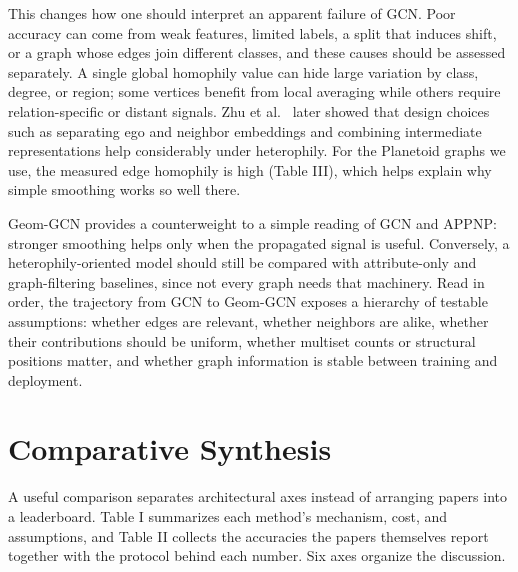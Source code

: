 \documentclass[conference]{IEEEtran}
\begin{document}
This changes how one should interpret an apparent failure of GCN. Poor accuracy can come from weak features, limited labels, a split that induces shift, or a graph whose edges join different classes, and these causes should be assessed separately. A single global homophily value can hide large variation by class, degree, or region; some vertices benefit from local averaging while others require relation-specific or distant signals. Zhu et al.~\cite{b14} later showed that design choices such as separating ego and neighbor embeddings and combining intermediate representations help considerably under heterophily. For the Planetoid graphs we use, the measured edge homophily is high (Table III), which helps explain why simple smoothing works so well there.

Geom-GCN provides a counterweight to a simple reading of GCN and APPNP: stronger smoothing helps only when the propagated signal is useful. Conversely, a heterophily-oriented model should still be compared with attribute-only and graph-filtering baselines, since not every graph needs that machinery. Read in order, the trajectory from GCN to Geom-GCN exposes a hierarchy of testable assumptions: whether edges are relevant, whether neighbors are alike, whether their contributions should be uniform, whether multiset counts or structural positions matter, and whether graph information is stable between training and deployment.

\section{Comparative Synthesis}

A useful comparison separates architectural axes instead of arranging papers into a leaderboard. Table I summarizes each method's mechanism, cost, and assumptions, and Table II collects the accuracies the papers themselves report together with the protocol behind each number. Six axes organize the discussion.
\end{document}
